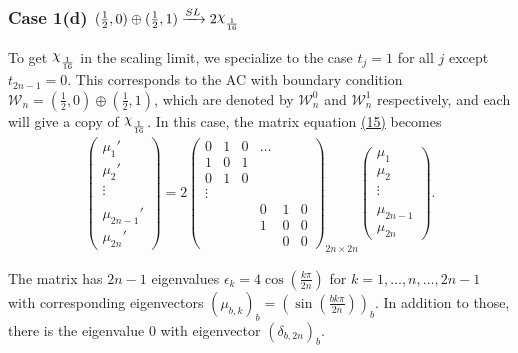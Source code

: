 \documentclass[twoside,11pt,titlepage]{amsart}
\renewcommand{\=}[1]{\stackrel{#1}{=}} %
\theoremstyle{definition}
\theoremstyle{remark}
\DeclareRobustCommand{\rchi}{{\mathpalette\irchi\relax}}
\newcommand{\irchi}[2]{\raisebox{\depth}{$#1\chi$}}
\begin{document}
\subsubsection*{\textbf{Case 1(d) $(\frac{1}{2},0) \oplus (\frac{1}{2},1) \xrightarrow{SL} 2\rchi_\frac{1}{16}$}}

\hfill \break

To get $\rchi_\frac{1}{16}$ in the scaling limit, we specialize to the case $t_j=1$ for all $j$ except $t_{2n-1}=0$. This corresponds to the AC with boundary condition $\mathcal{W}_n=(\frac{1}{2},0) \oplus (\frac{1}{2},1)$, which are denoted by $\mathcal{W}_n^0$ and $\mathcal{W}_n^1$ respectively, and each will give a copy of $\rchi_\frac{1}{16}$. In this case, the matrix equation \hyperref[eq15]{(15)} becomes
\begin{align}\label{eq21}
 \begin{pmatrix}
           \mu_1' \\
           \mu_{2}' \\
           \vdots \\
            \\
           \mu_{2n-1}'\\    
           \mu_{2n}'
         \end{pmatrix}
= 2\begin{pmatrix}
     0 & 1 & 0 & \ldots &  \\
     1 & 0 & 1 & & & \\
     0 & 1 & 0 & & &  \\
     \vdots & & & & & \\
     & & & 0 & 1 & 0 \\
     & &  & 1 & 0 & 0 \\
     & &  & & 0 & 0 
\end{pmatrix}_{2n \times 2n}
         \begin{pmatrix}
         \mu_1 \\
         \mu_{2} \\
         \vdots \\
            \\
         \mu_{2n-1}\\
         \mu_{2n}
         \end{pmatrix}.
\end{align}

The matrix has $2n-1$ eigenvalues $\epsilon_k=4\cos(\frac{k\pi}{2n})$ for $k =1,\ldots,n,\ldots,2n-1$ with corresponding eigenvectors $(\mu_{b,k})_b=(\sin(\frac{bk\pi}{2n}))_b$. In addition to those, there is the eigenvalue $0$ with eigenvector $(\delta_{b,2n})_b$.
\end{document}
